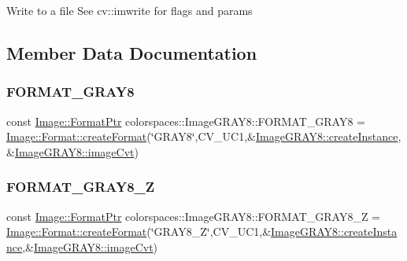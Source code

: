 Write to a file See cv\+::imwrite for flags and params 

\subsection{Member Data Documentation}
\mbox{\label{classcolorspaces_1_1_image_g_r_a_y8_a9bfb4420590a581d76aaaffb3a22806a}} 
\subsubsection{\texorpdfstring{F\+O\+R\+M\+A\+T\+\_\+\+G\+R\+A\+Y8}{FORMAT\_GRAY8}}
{\footnotesize\ttfamily const \hyperlink{classcolorspaces_1_1_image_ab3978cc7acc2b5e855f8c715f09667d1}{Image\+::\+Format\+Ptr} colorspaces\+::\+Image\+G\+R\+A\+Y8\+::\+F\+O\+R\+M\+A\+T\+\_\+\+G\+R\+A\+Y8 = \hyperlink{classcolorspaces_1_1_image_1_1_format_ae79208f237b72cf596331ebcec2ff58b}{Image\+::\+Format\+::create\+Format}(\char`\"{}G\+R\+A\+Y8\char`\"{},C\+V\+\_\+U\+C1,\&\hyperlink{classcolorspaces_1_1_image_g_r_a_y8_a3bcae629fe8c73e5a9bd2cd0e77edbfa}{Image\+G\+R\+A\+Y8\+::create\+Instance},\&\hyperlink{classcolorspaces_1_1_image_g_r_a_y8_ab024b45fab4a6c62e1dce8872fd19e7f}{Image\+G\+R\+A\+Y8\+::image\+Cvt})\hspace{0.3cm}{\ttfamily [static]}}

\mbox{\label{classcolorspaces_1_1_image_g_r_a_y8_af37dcabe8bbf5ef6f73ed790c88e4896}} 
\subsubsection{\texorpdfstring{F\+O\+R\+M\+A\+T\+\_\+\+G\+R\+A\+Y8\+\_\+Z}{FORMAT\_GRAY8\_Z}}
{\footnotesize\ttfamily const \hyperlink{classcolorspaces_1_1_image_ab3978cc7acc2b5e855f8c715f09667d1}{Image\+::\+Format\+Ptr} colorspaces\+::\+Image\+G\+R\+A\+Y8\+::\+F\+O\+R\+M\+A\+T\+\_\+\+G\+R\+A\+Y8\+\_\+Z = \hyperlink{classcolorspaces_1_1_image_1_1_format_ae79208f237b72cf596331ebcec2ff58b}{Image\+::\+Format\+::create\+Format}(\char`\"{}G\+R\+A\+Y8\+\_\+Z\char`\"{},C\+V\+\_\+U\+C1,\&\hyperlink{classcolorspaces_1_1_image_g_r_a_y8_a3bcae629fe8c73e5a9bd2cd0e77edbfa}{Image\+G\+R\+A\+Y8\+::create\+Instance},\&\hyperlink{classcolorspaces_1_1_image_g_r_a_y8_ab024b45fab4a6c62e1dce8872fd19e7f}{Image\+G\+R\+A\+Y8\+::image\+Cvt})\hspace{0.3cm}{\ttfamily [static]}}



